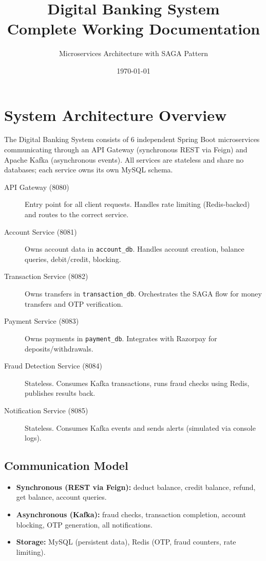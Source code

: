 \documentclass[12pt,a4paper]{article}
\title{\textbf{Digital Banking System\\Complete Working Documentation}}
\author{Microservices Architecture with SAGA Pattern}
\date{\today}
\begin{document}
\maketitle
\tableofcontents
\newpage

\section{System Architecture Overview}

The Digital Banking System consists of 6 independent Spring Boot microservices
communicating through an API Gateway (synchronous REST via Feign) and Apache
Kafka (asynchronous events). All services are stateless and share no databases;
each service owns its own MySQL schema.

\begin{description}
  \item[API Gateway (8080)] Entry point for all client requests. Handles rate
  limiting (Redis-backed) and routes to the correct service.
  \item[Account Service (8081)] Owns account data in \texttt{account\_db}.
  Handles account creation, balance queries, debit/credit, blocking.
  \item[Transaction Service (8082)] Owns transfers in \texttt{transaction\_db}.
  Orchestrates the SAGA flow for money transfers and OTP verification.
  \item[Payment Service (8083)] Owns payments in \texttt{payment\_db}.
  Integrates with Razorpay for deposits/withdrawals.
  \item[Fraud Detection Service (8084)] Stateless. Consumes Kafka transactions,
  runs fraud checks using Redis, publishes results back.
  \item[Notification Service (8085)] Stateless. Consumes Kafka events and sends
  alerts (simulated via console logs).
\end{description}

\subsection{Communication Model}
\begin{itemize}
  \item \textbf{Synchronous (REST via Feign):} deduct balance, credit balance,
  refund, get balance, account queries.
  \item \textbf{Asynchronous (Kafka):} fraud checks, transaction completion,
  account blocking, OTP generation, all notifications.
  \item \textbf{Storage:} MySQL (persistent data), Redis (OTP, fraud counters,
  rate limiting).
\end{itemize}
\end{document}
